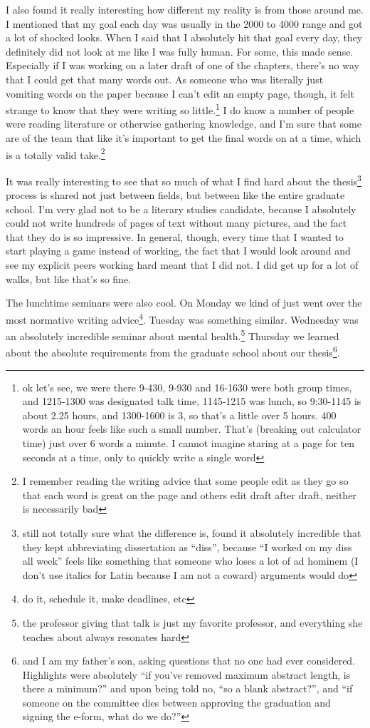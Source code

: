\documentclass[12pt]{article}
\newcommand{\say}[1]{``#1''}
\renewcommand{\,}{\textsuperscript{,}}
\begin{document}
I also found it really interesting how different my reality is from those around me.  
I mentioned that my goal each day was usually in the 2000 to 4000 range and got a lot of shocked looks.  
When I said that I absolutely hit that goal every day, they definitely did not look at me like I was fully human.  
For some, this made sense.  
Especially if I was working on a later draft of one of the chapters, there's no way that I could get that many words out.  
As someone who was literally just vomiting words on the paper because I can't edit an empty page, though, it felt strange to know that they were writing so little.\footnote{ok let's see, we were there 9-430, 9-930 and 16-1630 were both group times, and 1215-1300 was designated talk time, 1145-1215 was lunch, so 9:30-1145 is about 2.25 hours, and 1300-1600 is 3, so that's a little over 5 hours. 400 words an hour feels like such a small number. That's (breaking out calculator time) just over 6 words a minute. I cannot imagine staring at a page for ten seconds at a time, only to quickly write a single word}  
I do know a number of people were reading literature or otherwise gathering knowledge, and I'm sure that some are of the team that like it's important to get the final words on at a time, which is a totally valid take.\footnote{I remember reading the writing advice that some people edit as they go so that each word is great on the page and others edit draft after draft, neither is necessarily bad}

It was really interesting to see that so much of what I find hard about the thesis\footnote{still not totally sure what the difference is, found it absolutely incredible that they kept abbreviating dissertation as \say{diss}, because \say{I worked on my diss all week} feels like something that someone who loses a lot of ad hominem (I don't use italics for Latin because I am not a coward) arguments would do} process is shared not just between fields, but between like the entire graduate school.  
I'm very glad not to be a literary studies candidate, because I absolutely could not write hundreds of pages of text without many pictures, and the fact that they do is so impressive.  
In general, though, every time that I wanted to start playing a game instead of working, the fact that I would look around and see my explicit peers working hard meant that I did not.  
I did get up for a lot of walks, but like that's so fine.

The lunchtime seminars were also cool.  
On Monday we kind of just went over the most normative writing advice\footnote{do it, schedule it, make deadlines, etc}.  
Tuesday was something similar.  
Wednesday was an absolutely incredible seminar about mental health.\footnote{the professor giving that talk is just my favorite professor, and everything she teaches about always resonates hard}  
Thursday we learned about the absolute requirements from the graduate school about our thesis\footnote{and I am my father's son, asking questions that no one had ever considered. Highlights were absolutely \say{if you've removed maximum abstract length, is there a minimum?} and upon being told no, \say{so a blank abstract?}, and \say{if someone on the committee dies between approving the graduation and signing the e-form, what do we do?}}.
\end{document}
